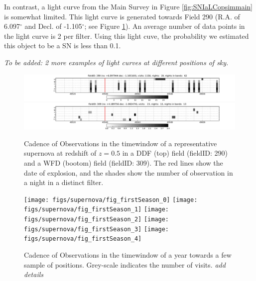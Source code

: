 In contrast, a light curve from the Main Survey in Figure \ref{fig:SNIaLCopsimmain} is
somewhat limited. 
This light curve is generated towards Field 290 (R.A. of 6.097$^{\circ}$
and Decl. of -1.105$^{\circ}$; see Figure \ref{fig:perSNCadence}). An average number of
data points in the light curve is 2 per filter. Using this light cuve, the probability we
 estimated this object to be a SN is less than 0.1. 

\emph{To be added: 2 more examples of light curves at different positions of sky.}







\begin{figure}[tbh!]
\includegraphics[angle=0,width=\textwidth,clip]{figs/SN_Cadence_290.pdf}
\includegraphics[angle=0,width=\textwidth,clip]{figs/SN_Cadence_309.pdf}
\caption{Cadence of Observations in the timewindow of a representative supernova at redshift of $z=0.5$ in a DDF (top) field (fieldID: 290) and a WFD (bootom) field (fieldID: 309). The red lines show the date of explosion, and the shades show the number of observation in a night in a distinct filter.}
\label{fig:perSNCadence}
\end{figure}



\begin{figure}[!hb]
    \begin{minipage}[b]{\linewidth}
        \texttt{[image: figs/supernova/fig\_firstSeason\_0]}
        \texttt{[image: figs/supernova/fig\_firstSeason\_1]}
        \texttt{[image: figs/supernova/fig\_firstSeason\_2]}
        \texttt{[image: figs/supernova/fig\_firstSeason\_3]}
        \texttt{[image: figs/supernova/fig\_firstSeason\_4]}
    \end{minipage}
\label{fig:opsimSummary}
\caption{Cadence of Observations in the timewindow of a year towards a few sample of 
positions. Grey-scale indicates the number of visits. {\it add details} 
}
\end{figure}


